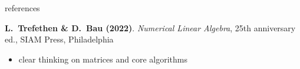 \documentclass[10pt,
               svgnames,
               hyperref={colorlinks,citecolor=DeepPink4,linkcolor=FireBrick,urlcolor=Maroon},
               usepdftitle=false]{beamer}
\begin{document}
\begin{frame}{references}

\begin{itemize}
{\small
\item[] \textbf{L.~Trefethen \& D.~Bau (2022)}. \emph{Numerical Linear Algebra}, 25th anniversary ed., SIAM Press, Philadelphia
    \begin{itemize}
    \item[$\circ$] clear thinking on matrices and core algorithms
    \end{itemize}
}
\end{itemize}

\end{frame}
\end{document}
